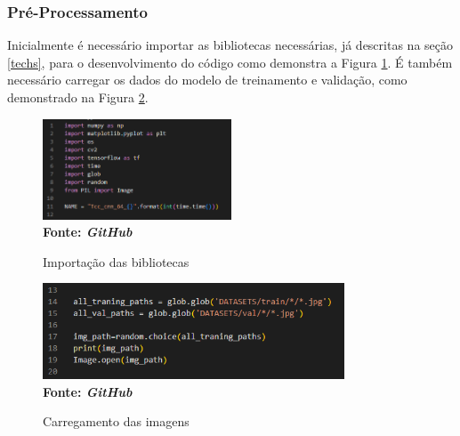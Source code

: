 \subsubsection{\esp Pré-Processamento} \label{preprocess}
Inicialmente é necessário importar as bibliotecas necessárias, já descritas na seção \ref{techs}, para o desenvolvimento do código como demonstra a Figura \ref{fig:bibs}. É também necessário carregar os dados do modelo de treinamento e validação, como demonstrado na Figura \ref{fig:load}.

 \begin{figure}[ht]
 	\centering	
 	\caption[\hspace{0.1cm}Grade Computacional.]{Importação das bibliotecas}
 	\vspace{-0.4cm}
 	\includegraphics[width=0.5\textwidth]{figuras/bibs.png}
 	\captionsetup{justification=centering}
	\vspace{-0.2cm}
    \\\textbf{\footnotesize Fonte: \textit{GitHub}}
	\label{fig:bibs}
\end{figure}

 \begin{figure}[ht]
 	\centering	
 	\caption[\hspace{0.1cm}Grade Computacional.]{Carregamento das imagens}
 	\vspace{-0.4cm}
 	\includegraphics[width=0.8\textwidth]{figuras/load_images.png}
 	\captionsetup{justification=centering}
	\vspace{-0.2cm}
     \\\textbf{\footnotesize Fonte: \textit{GitHub}}
	\label{fig:load}
\end{figure}

